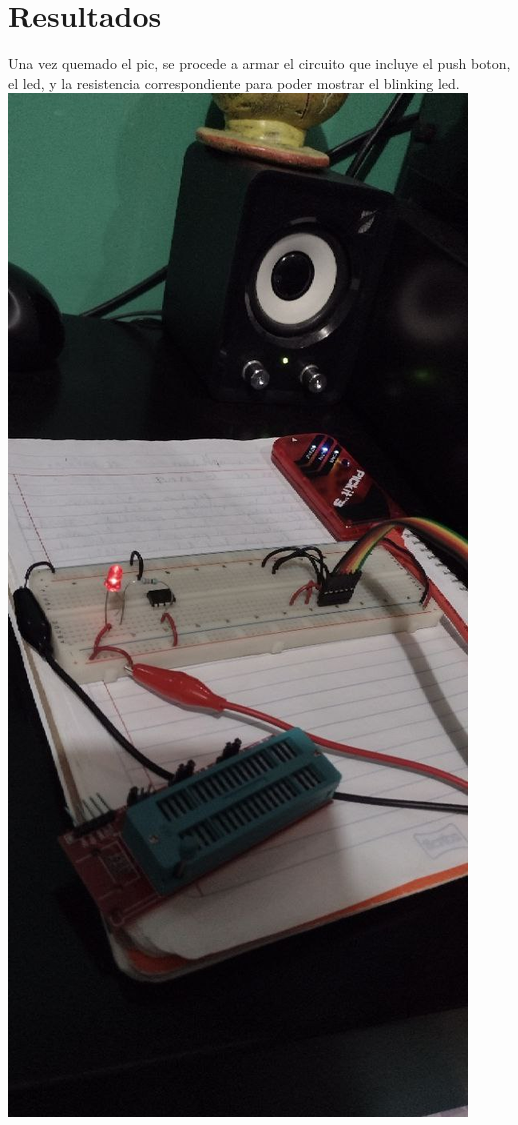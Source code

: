 \documentclass{article}
\begin{document}
\section{Resultados}
Una vez quemado el pic, se procede a armar el circuito que incluye el push boton, el led, y la resistencia correspondiente para poder mostrar el blinking led.\\
\includegraphics[scale=0.3]{led}\\
\end{document}
